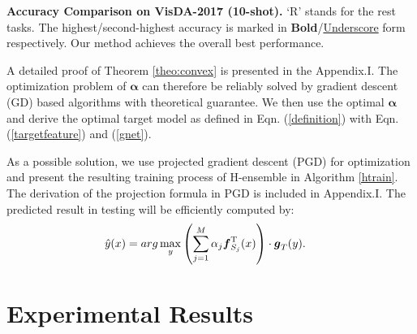 \documentclass[letterpaper]{article} %
\begin{document}
\begin{table*}[!h]
    \caption{\textbf{Accuracy Comparison on VisDA-2017 (10-shot).} `R' stands for the rest tasks. The highest/second-highest accuracy is marked in \textbf{Bold}/\underline{Underscore} form respectively. Our method achieves the overall best performance.
    }
    \label{tab:comparison}
\end{table*}


 A detailed proof of Theorem \ref{theo:convex} is presented in the Appendix.I. The optimization problem of $\boldsymbol{\alpha}$ can therefore be reliably solved by gradient descent (GD) based algorithms with theoretical guarantee. We then use the optimal $\boldsymbol{\alpha}$ and derive the optimal target model as defined in Eqn. (\ref{definition}) with Eqn. (\ref{targetfeature}) and (\ref{gnet}).


As a possible solution, we use projected gradient descent (PGD) for optimization and present the resulting training process of H-ensemble in Algorithm \ref{htrain}. The derivation of the projection formula in PGD is included in Appendix.I. The predicted result in testing will be efficiently computed by:
\begin{equation}
    \begin{aligned}
            \hat{y}(x) &= arg\max_y \left(\sum_{j = 1}^{M} \alpha_j \boldsymbol{f}_{S_j}^{\rm T}(x)\right)\cdot\boldsymbol{g}_T(y).
    \end{aligned}
\end{equation}









\section{Experimental Results}\label{exp}
\end{document}
